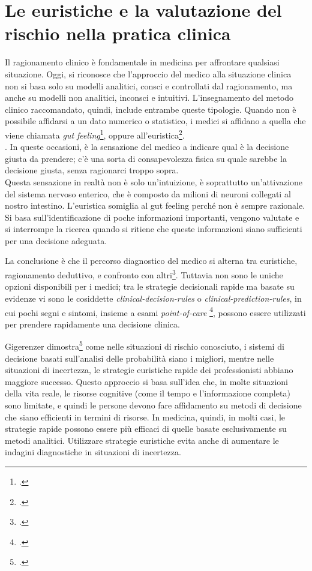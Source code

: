 \section{Le euristiche e la valutazione del rischio nella pratica clinica}

Il ragionamento clinico è fondamentale in medicina per affrontare qualsiasi situazione. Oggi, si riconosce che l'approccio del medico alla situazione clinica non si basa solo su modelli analitici, consci e controllati dal ragionamento, ma anche su modelli non analitici, inconsci e intuitivi. L'insegnamento del metodo clinico raccomandato, quindi, include entrambe queste tipologie. Quando non è possibile affidarsi a un dato numerico o statistico, i medici si affidano a quella che viene chiamata \textit{gut feeling}\footcite{womak:arte-probabilita-coen}, oppure all'euristica\footcite{womak:recenti-progressi-medicina}.\\. 
In queste occasioni, è la sensazione del medico a indicare qual è la decisione giusta da prendere; c'è una sorta di consapevolezza fisica su quale sarebbe la decisione giusta, senza ragionarci troppo sopra.\\
Questa sensazione in realtà non è solo un'intuizione, è soprattutto un'attivazione del sistema nervoso enterico, che è composto da milioni di neuroni collegati al nostro intestino. L'euristica somiglia al gut feeling perché non è sempre razionale. Si basa sull'identificazione di poche informazioni importanti, vengono valutate e si interrompe la ricerca quando si ritiene che queste informazioni siano sufficienti per una decisione adeguata.

La conclusione è che il percorso diagnostico del medico si alterna tra euristiche, ragionamento deduttivo, e confronto con altri\footcite{womak:arte-probabilita-coen}. Tuttavia non sono le uniche opzioni disponibili per i medici; tra le strategie decisionali rapide ma basate su evidenze vi sono le cosiddette \textit{\gls{clinical-decision-rules}} o \textit{\gls{clinical-prediction-rules}}, in cui pochi segni e sintomi, insieme a esami \textit{\gls{point-of-care}} \footcite{womak:recenti-progressi-medicina}, possono essere utilizzati per prendere rapidamente una decisione clinica.

Gigerenzer dimostra\footcite{womak:gigerenzer-euristiche} come nelle situazioni di rischio conosciuto, i sistemi di decisione basati sull'analisi delle probabilità siano i migliori, mentre nelle situazioni di incertezza, le strategie euristiche rapide dei professionisti abbiano maggiore successo. Questo approccio si basa sull'idea che, in molte situazioni della vita reale, le risorse cognitive (come il tempo e l'informazione completa) sono limitate, e quindi le persone devono fare affidamento su metodi di decisione che siano efficienti in termini di risorse. In medicina, quindi, in molti casi, le strategie rapide possono essere più efficaci di quelle basate esclusivamente su metodi analitici. Utilizzare strategie euristiche evita anche di aumentare le indagini diagnostiche in situazioni di incertezza.\\

